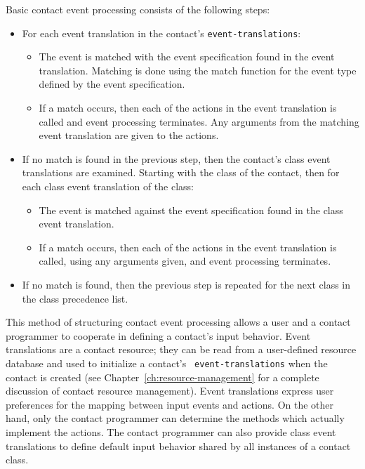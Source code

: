 \documentclass[twoside]{book}
\begin{document}
\begin{sloppy}
Basic contact event processing consists of the following steps:
\begin{itemize}
\item For each event translation in the contact's {\tt event-translations}:
\begin{itemize}
\item The event is matched with the event specification found in the event
translation. Matching is done using the match function for the event type defined by
the event specification.
\item If a match occurs, then each of
the actions in the event translation is called and event processing terminates.
Any arguments from the matching event translation are given to the actions.
\end{itemize}
\item If no match is found in the previous step, then the contact's class event
translations are examined. Starting with the class of the contact, then for each
class event translation of the class: 
\begin{itemize}
\item The event is matched against the event specification found in the class
event translation. 
\item If a match occurs, then each of
the actions in the event translation is called, using any arguments given, and 
event processing terminates.
\end{itemize}
\item If no match is found, then the previous step is repeated for the next
class in the class precedence list. 
\end{itemize}
 

This method of structuring contact event processing allows a user and a contact
programmer to cooperate in defining a contact's input behavior.
Event translations are a contact resource; they can be read from a
user-defined resource
database and used to initialize a contact's {\tt
event-translations} when
the contact is created (see Chapter~\ref{ch:resource-management}
for a complete discussion of contact resource management). Event translations
express user preferences for the mapping between input events and 
actions. On the other hand, only the contact programmer can determine the
methods which actually implement the actions.
The contact programmer can also provide class event translations to define default
input behavior shared by all instances of a contact class.


\end{sloppy}
\end{document}
